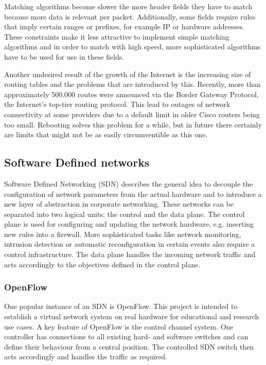 \documentclass[a4paper,
		12pt,
		parskip=full,
		titlepage
		]{scrartcl}
\begin{document}
Matching algorithms become slower the more header fields they have to match because more data is relevant per packet.
Additionally, some fields require rules that imply certain ranges or prefixes, for example IP or hardware addresses.
These constraints make it less attractive to implement simple matching algorithms and in order to match with high speed, more sophisticated
algorithms have to be used for use in these fields.

Another undesired result of the growth of the Internet is the increasing size of routing tables and the problems that are introduced by this.
Recently, more than approximately 500.000 routes were announced via the Border Gateway Protocol, the Internet's top-tier routing protocol.
This lead to outages of network connectivity at some providers due to a default limit in older Cisco routers being too small\cite{outage}.
Rebooting solves this problem for a while, but in future there certainly are limits that might not be as easily circumventible as this one.

\subsection{Software Defined networks}
\label{sec:SDN}
Software Defined Networking (SDN) describes the general idea to decouple 
the configuration of network parameters from the actual hardware and to 
introduce a new layer of abstraction in corporate networking\cite{onf_whitepaper}.
These networks can be separated into two logical units: the control and the data plane.
The control plane is used for configuring and updating the network hardware, e.g. inserting new rules into a firewall.
More sophisticated tasks like network monitoring, intrusion detection or automatic reconfiguration in certain events also require a control infrastructure.
The data plane handles the incoming network traffic and acts accordingly to the objectives defined in the control plane.

\subsubsection{OpenFlow}
One popular instance of an SDN is OpenFlow\cite{openflow_spec10}.
This project is intended to establish a virtual network system on real hardware for educational and research use cases.
A key feature of OpenFlow is the control channel system.
One controller has connections to all existing hard- and software switches and can define their behaviour from a central position.
The controlled SDN switch then acts accordingly and handles the traffic as required.
\end{document}
